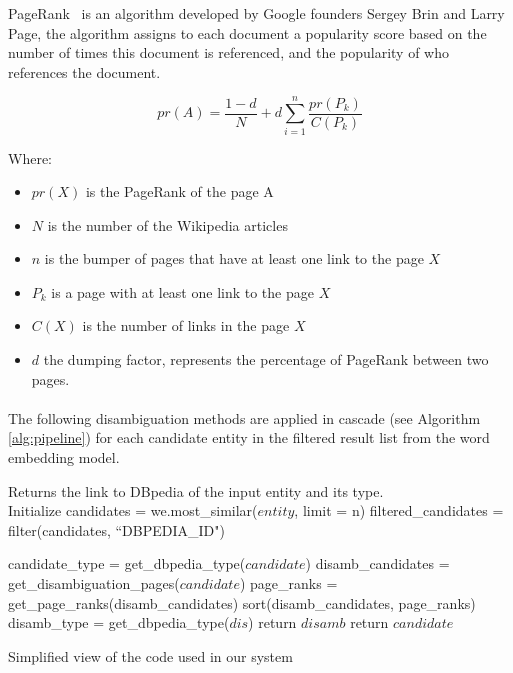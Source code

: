 PageRank~\cite{brin1998anatomy} is an algorithm developed by Google founders Sergey Brin and Larry Page, the algorithm assigns to each document a popularity score based on the number of times this document is referenced, and the popularity of who references the document.

\begin{equation}
pr(A) = \frac{1 - d}{N} + d \sum\limits_{i=1}^{n}\frac{pr(P_k)}{C(P_k)}
\end{equation}

\pagebreak

Where:
\begin{itemize}[noitemsep]
\item \(pr(X)\) is the PageRank of the page A
\item \(N\) is the number of the Wikipedia articles
\item \(n\) is the bumper of pages that have at least one link to the page \(X\)
\item \(P_k\) is a page with at least one link to the page \(X\)
\item \(C(X)\) is the number of links in the page \(X\)
\item \(d\) the dumping factor, represents the percentage of PageRank between two pages.
\end{itemize}

\paragraph{}
The following disambiguation methods are applied in cascade (see Algorithm \ref{alg:pipeline}) for each candidate entity in the filtered result list from the word embedding model. 

\begin{algorithm}
\begin{algorithmic}[1]
\State Returns the link to DBpedia of the input entity and its type.
\\
\State Initialize
\State candidates = we.most\_similar(\(entity\), limit = n)
\State filtered\_candidates = filter(candidates, ``DBPEDIA\_ID")

    \State candidate\_type = get\_dbpedia\_type($candidate$)
    			\State disamb\_candidates = get\_disambiguation\_pages($candidate$)
    			\State page\_ranks = get\_page\_ranks(disamb\_candidates)
    			\State sort(disamb\_candidates, page\_ranks)
    					\State disamb\_type = get\_dbpedia\_type($dis$)
    				    \State return $disamb$
    				    \EndIf
    			\EndFor
    	\Else
    	\State return $candidate$
    	\EndIf
    \EndIf
\EndFor

\caption[caption]{Simplified view of the code used in our system}
\label{alg:pipeline}
\end{algorithmic}
\end{algorithm}

